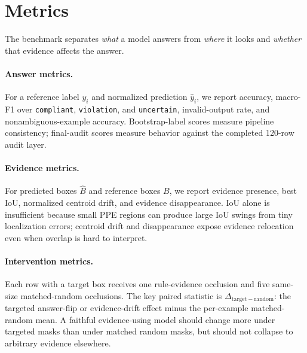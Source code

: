 \section{Metrics}

The benchmark separates \emph{what} a model answers from \emph{where} it looks and \emph{whether} that evidence affects the answer.

\paragraph{Answer metrics.}
For a reference label $y_i$ and normalized prediction $\hat{y}_i$, we report accuracy, macro-F1 over \texttt{compliant}, \texttt{violation}, and \texttt{uncertain}, invalid-output rate, and nonambiguous-example accuracy. Bootstrap-label scores measure pipeline consistency; final-audit scores measure behavior against the completed 120-row audit layer.

\paragraph{Evidence metrics.}
For predicted boxes $\hat{B}$ and reference boxes $B$, we report evidence presence, best IoU, normalized centroid drift, and evidence disappearance. IoU alone is insufficient because small PPE regions can produce large IoU swings from tiny localization errors; centroid drift and disappearance expose evidence relocation even when overlap is hard to interpret.

\paragraph{Intervention metrics.}
Each row with a target box receives one rule-evidence occlusion and five same-size matched-random occlusions. The key paired statistic is $\Delta_{\mathrm{target-random}}$: the targeted answer-flip or evidence-drift effect minus the per-example matched-random mean. A faithful evidence-using model should change more under targeted masks than under matched random masks, but should not collapse to arbitrary evidence elsewhere.
